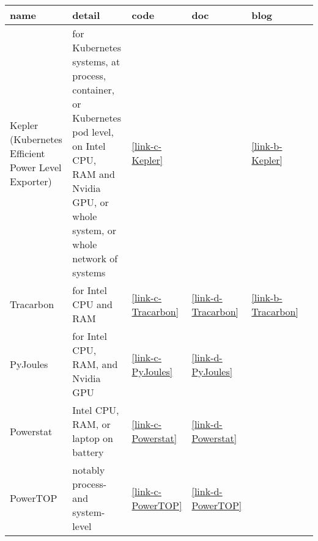 \begin{tabular}{|>{\raggedright\arraybackslash}p{3.2cm}|p{6.5cm}|p{1.5cm}|p{1.5cm}|p{1.5cm}|l}
\toprule
name & detail & code & doc & blog \\
\midrule
Kepler (Kubernetes Efficient Power Level Exporter) & for Kubernetes systems, at process, container, or Kubernetes pod level, on Intel CPU, RAM and Nvidia GPU, or whole system, or whole network of systems &  \href{https://github.com/sustainable-computing-io/kepler}{\ref*{link-c-Kepler}} &  &  \href{https://sustainable-computing.io/}{\ref*{link-b-Kepler}} \\
Tracarbon & for Intel CPU and RAM &  \href{https://github.com/fvaleye/tracarbon}{\ref*{link-c-Tracarbon}} &  \href{https://fvaleye.github.io/tracarbon/documentation/}{\ref*{link-d-Tracarbon}} &  \href{https://medium.com/@florian.valeye/tracarbon-track-your-devices-carbon-footprint-fb051fcc9009}{\ref*{link-b-Tracarbon}} \\
PyJoules & for Intel CPU, RAM, and Nvidia GPU &  \href{https://github.com/powerapi-ng/pyJoules}{\ref*{link-c-PyJoules}} &  \href{https://pyjoules.readthedocs.io/en/latest/}{\ref*{link-d-PyJoules}} &  \\
Powerstat & Intel CPU, RAM, or laptop on battery &  \href{https://github.com/ColinIanKing/powerstat}{\ref*{link-c-Powerstat}} &  \href{https://manpages.ubuntu.com/manpages/bionic/man8/powerstat.8.html}{\ref*{link-d-Powerstat}} &  \\
PowerTOP & notably process- and system-level &  \href{https://github.com/fenrus75/powertop}{\ref*{link-c-PowerTOP}} &  \href{https://manpages.ubuntu.com/manpages/mantic/en/man8/powertop.8.html}{\ref*{link-d-PowerTOP}} &  \\
\bottomrule
\end{tabular}
